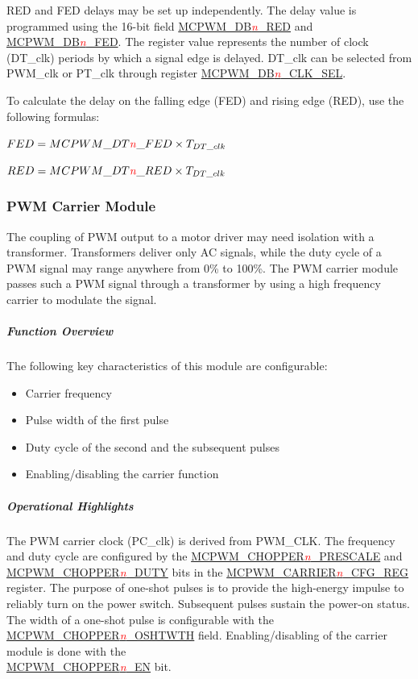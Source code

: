 \documentclass[main\_\_EN.tex]{subfiles}
\begin{document}
RED and FED delays may be set up independently. The delay value is programmed using the 16-bit field \hyperref[fielddesc:MCPWMDBNRED]{MCPWM\_DB\textcolor{red}{\it{n}}\_RED} and \hyperref[fielddesc:MCPWMDBNFED]{MCPWM\_DB\textcolor{red}{\it{n}}\_FED}. The register value represents the number of clock (DT\_clk) periods by which a signal edge is delayed. DT\_clk can be selected from PWM\_clk or PT\_clk through register \hyperref[fielddesc:MCPWMDBNCLKSEL]{MCPWM\_DB\textcolor{red}{\it{n}}\_CLK\_SEL}.

To calculate the delay on the falling edge (FED) and rising edge (RED), use the following formulas:
\begin{center}
    \item $FED = MCPWM\_DT\textcolor{red}{\it{n}}\_FED \times T_{DT\_clk}$
    \item $RED = MCPWM\_DT\textcolor{red}{\it{n}}\_RED \times T_{DT\_clk}$
\end{center}

\newpage

\subsubsection{PWM Carrier Module}
The coupling of PWM output to a motor driver may need isolation with a transformer. Transformers deliver only AC signals, while the duty cycle of a PWM signal may range anywhere from 0\% to 100\%. The PWM carrier module passes such a PWM signal through a transformer by using a high frequency carrier to modulate the signal.

\subparagraph{Function Overview}
The following key characteristics of this module are configurable:
\begin{itemize}
    \item Carrier frequency
    \item Pulse width of the first pulse
    \item Duty cycle of the second and the subsequent pulses
    \item Enabling/disabling the carrier function
\end{itemize}

\subparagraph{Operational Highlights}
The PWM carrier clock (PC\_clk) is derived from PWM\_CLK. The frequency and duty cycle are configured by the \hyperref[fielddesc:MCPWMCHOPPERNPRESCALE]{MCPWM\_CHOPPER\textcolor{red}{\it{n}}\_PRESCALE} and \hyperref[fielddesc:MCPWMCHOPPERNDUTY]{MCPWM\_CHOPPER\textcolor{red}{\it{n}}\_DUTY} bits in the \hyperref[regdesc:MCPWMCARRIERNCFGREG]{MCPWM\_CARRIER\textcolor{red}{\it{n}}\_CFG\_REG} register. The purpose of one-shot pulses is to provide the high-energy impulse to reliably turn on the power switch. Subsequent pulses sustain the power-on status. The width of a one-shot pulse is configurable with the\\ \hyperref[fielddesc:MCPWMCHOPPERNOSHTWTH]{MCPWM\_CHOPPER\textcolor{red}{\it{n}}\_OSHTWTH} field. Enabling/disabling of the carrier module is done with the\\ \hyperref[fielddesc:MCPWMCHOPPERNEN]{MCPWM\_CHOPPER\textcolor{red}{\it{n}}\_EN} bit.
\end{document}
